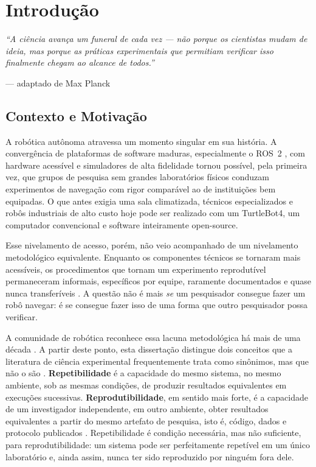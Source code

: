 \chapter{Introdução}
\label{chap:introducao}

\epigraph{\itshape ``A ciência avança um funeral de cada vez --- não porque os cientistas
mudam de ideia, mas porque as práticas experimentais que permitiam verificar isso
finalmente chegam ao alcance de todos.''}{\normalfont --- adaptado de Max Planck}

\section{Contexto e Motivação}
\label{sec:motivacao}

A robótica autônoma atravessa um momento singular em sua história. A convergência de
plataformas de software maduras, especialmente o ROS~2 \cite{macenski2022ros2},
com hardware acessível e simuladores de alta fidelidade \cite{koenig2004gazebo} tornou possível, pela
primeira vez, que grupos de pesquisa sem grandes laboratórios físicos conduzam
experimentos de navegação com rigor comparável ao de instituições bem equipadas.
O que antes exigia uma sala climatizada, técnicos especializados e robôs industriais
de alto custo hoje pode ser realizado com um TurtleBot4, um computador convencional
e software inteiramente open-source.

Esse nivelamento de acesso, porém, não veio acompanhado de um nivelamento
metodológico equivalente. Enquanto os componentes técnicos se tornaram mais acessíveis,
os procedimentos que tornam um experimento reprodutível permaneceram informais,
específicos por equipe, raramente documentados e quase nunca transferíveis
\cite{amigoni2014}. A questão
não é mais \textit{se} um pesquisador consegue fazer um robô navegar: é se consegue
fazer isso de uma forma que outro pesquisador possa verificar.

A comunidade de robótica reconhece essa lacuna metodológica há mais de uma
década \cite{bonsignorio2015}. A partir deste ponto, esta dissertação distingue
dois conceitos que a literatura de ciência experimental frequentemente
trata como sinônimos, mas que não o são \cite{acm2020badging}. \textbf{Repetibilidade} é a capacidade do
mesmo sistema, no mesmo ambiente, sob as mesmas condições, de produzir
resultados equivalentes em execuções sucessivas. \textbf{Reprodutibilidade}, em
sentido mais forte, é a capacidade de um investigador independente, em outro
ambiente, obter resultados equivalentes a partir do mesmo artefato de pesquisa,
isto é, código, dados e protocolo publicados \cite{amigoni2010}. Repetibilidade é
condição necessária, mas não suficiente, para reprodutibilidade: um sistema
pode ser perfeitamente repetível em um único laboratório e, ainda assim, nunca
ter sido reproduzido por ninguém fora dele.

